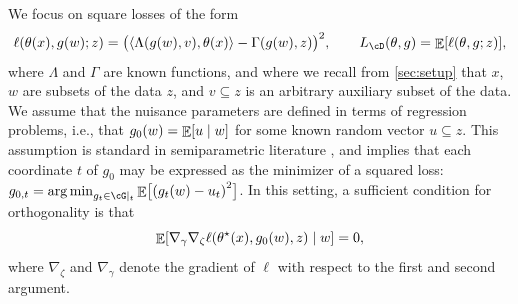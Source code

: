 \documentclass[11pt]{article} %
\newcommand{\preprint}[1]{\iftoggle{journal}{}{#1}}
\newcommand{\pref}[1]{\cref{#1}}
\theoremstyle{theorem}  %
\theoremstyle{plain}
\DeclarePairedDelimiter{\brk}{[}{]}
\DeclarePairedDelimiter{\prn}{(}{)}
\DeclarePairedDelimiter{\tri}{\langle}{\rangle}
\DeclareMathOperator{\En}{\mathbb{E}}
\DeclareMathOperator*{\argmin}{arg\,min} %
\newcommand{\ls}{\ell}
\newcommand{\rbar}{|}
\newcommand{\poprisk}{L_{\cD}}
\newcommand{\varall}{z}
\newcommand{\varone}{w} %
\newcommand{\vartwo}{x} %
\newcommand{\besttwo}{\theta^{\star}}
\newcommand{\gtone}{g_0}
\newcommand{\params}{parameters\xspace}
\begin{document}
%
We focus on\preprint{ the important special case of} square losses of the form
\begin{equation}%
\ls(\theta(\vartwo),g(\varone); z) = \bigl(
\tri{\Lambda(g(\varone), v), \theta(\vartwo)}- \Gamma(g(\varone),\varall)\bigr)^{2}, \quad\quad\poprisk(\theta,g)=\En\brk{\ls(\theta,g;z)},
\label{eq:square_oracle}
\end{equation}
where $\Lambda$ and $\Gamma$ are known functions, and where we recall from \pref{sec:setup} that $x$, $w$ are subsets of the data $z$, and $v\subseteq{}z$ is an arbitrary auxiliary subset of the data. We assume that the nuisance \params are defined in terms of regression problems, i.e., that $\gtone(w)=\En\brk*{u\mid{}w}$ for some known random vector $u\subseteq{}z$. This assumption is standard in semiparametric literature \citep{bickel1993efficient,kosorok2008introduction,van2011targeted}, and implies that each coordinate $t$ of $g_0$ may be expressed as the minimizer of a squared loss: $g_{0,t}=\argmin_{g_t\in\cG\rbar_t}\En\brk[\big]{\prn*{g_{t}(w)-u_t}^2}$. In this setting, a sufficient condition for orthogonality is that
\begin{equation}\label{eqn:oracle_orthogonality}
\En\brk*{\nabla_{\gamma}\nabla_{\zeta} \ell(\besttwo(\vartwo), \gtone(\varone), z) \mid \varone} = 0,
\end{equation}
where $\nabla_{\zeta}$ and $\nabla_{\gamma}$ denote the gradient of $\ls$ with respect to the first and second argument\preprint{, respectively}.

%
\end{document}
